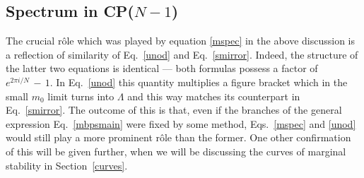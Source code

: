 \documentclass[epsfig,12pt]{article}
\begin{document}
\subsection{Spectrum in CP($N-1$)}


	The crucial r\^ole which was played by equation \eqref{mspec} in the above discussion
	is a reflection of similarity of Eq.~\eqref{unod} and Eq.~\eqref{smirror}.
	Indeed, the structure of the latter two equations is identical --- 
	both formulas possess a factor of $ e^{2\pi i / N} \,-\, 1 $.
	In Eq.~\eqref{unod} this quantity multiplies a figure bracket which in the small $ m_0 $ limit
	turns into $ \Lambda $ and this way matches its counterpart in Eq.~\eqref{smirror}.
	The outcome of this is that, even if the branches of the general expression Eq.~\eqref{mbpsmain} were fixed by 
	some method, Eqs.~\eqref{mspec} and \eqref{unod} would still play a more prominent r\^ole than the former.
	One other confirmation of this will be given further, when we will be discussing the curves
	of marginal stability in Section~\ref{curves}.
	
\end{document}
